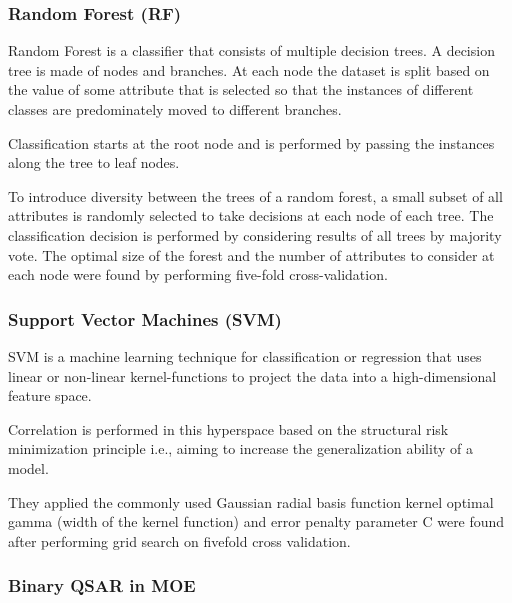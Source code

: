 \subsubsection{Random Forest (RF)}
Random Forest is a classifier that consists of multiple decision trees. A decision tree is made of nodes and branches. At each node the dataset is split based on the value of some attribute that is selected so that the instances of different classes are predominately moved to different branches. 

Classification starts at the root node and is performed by passing the instances along the tree to leaf nodes. \cite{Lapins2013}

To introduce diversity between the trees of a random forest, a small subset of all attributes is randomly selected to take decisions at each node of each tree. The classification decision is performed by considering results of all trees by majority vote. The optimal size of the forest and the number of attributes to consider at each node were found by performing five-fold cross-validation. \cite{Lapins2013}

\subsubsection{Support Vector Machines (SVM)}
SVM is a machine learning technique for classification or regression that uses linear or non-linear kernel-functions to project the data into a high-dimensional feature space. \cite{Lapins2013}

Correlation is performed in this hyperspace based on the structural risk minimization principle i.e., aiming to increase the generalization ability of a model. \cite{Lapins2013}

They applied the commonly used Gaussian radial basis function kernel optimal gamma (width of the kernel function) and error penalty parameter C were found after performing grid search on five­fold cross validation. \cite{Lapins2013}

\subsubsection{Binary QSAR in MOE}



